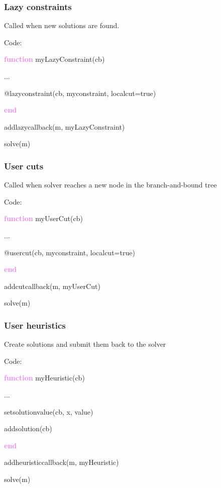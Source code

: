 \documentclass{beamer}
\begin{document}
\begin{frame}
  \frametitle{Lazy constraints}
  Called when new solutions are found.

  \begin{block}{Code:}\footnotesize
    
    \textcolor{violet}{\textbf{function}} myLazyConstraint(cb)
    
    \hspace{1cm}    ...
    
    \hspace{1cm}    @lazyconstraint(cb, myconstraint, localcut=true)

    \textcolor{violet}{\bf end}
    
    addlazycallback(m, myLazyConstraint)

    solve(m)
  \end{block}

\end{frame}


\begin{frame}
  \frametitle{User cuts}
  Called when solver reaches a new node in the branch-and-bound tree

  \begin{block}{Code:}\footnotesize
    
    \textcolor{violet}{\textbf{function}} myUserCut(cb)
    
    \hspace{1cm}    ...
    
    \hspace{1cm}    @usercut(cb, myconstraint, localcut=true)

    \textcolor{violet}{\bf end}
    
    addcutcallback(m, myUserCut)

    solve(m)
  \end{block}
  
\end{frame}


\begin{frame}
  \frametitle{User heuristics}

  Create solutions and submit them back to the solver

  \begin{block}{Code:}\footnotesize
    
    \textcolor{violet}{\textbf{function}} myHeuristic(cb)
    
    \hspace{1cm}    ...
    
    \hspace{1cm}    setsolutionvalue(cb, x, value)
    
    \hspace{1cm}    addsolution(cb)

    \textcolor{violet}{\bf end}
    
    addheuristiccallback(m, myHeuristic)

    solve(m)
  \end{block}

\end{frame}
\end{document}
